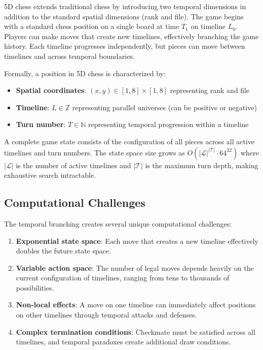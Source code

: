 \documentclass{article}
\begin{document}
5D chess extends traditional chess by introducing two temporal dimensions in addition to the standard spatial dimensions (rank and file). The game begins with a standard chess position on a single board at time $T_1$ on timeline $L_0$. Players can make moves that create new timelines, effectively branching the game history. Each timeline progresses independently, but pieces can move between timelines and across temporal boundaries.

Formally, a position in 5D chess is characterized by:
\begin{itemize}
    \item \textbf{Spatial coordinates}: $(x, y) \in [1,8] \times [1,8]$ representing rank and file
    \item \textbf{Timeline}: $L \in \mathbb{Z}$ representing parallel universes (can be positive or negative)
    \item \textbf{Turn number}: $T \in \mathbb{N}$ representing temporal progression within a timeline
\end{itemize}

A complete game state consists of the configuration of all pieces across all active timelines and turn numbers. The state space size grows as $O(|\mathcal{L}|^{|\mathcal{T}|} \cdot 64^{32})$ where $|\mathcal{L}|$ is the number of active timelines and $|\mathcal{T}|$ is the maximum turn depth, making exhaustive search intractable.

\subsection{Computational Challenges}

The temporal branching creates several unique computational challenges:

\begin{enumerate}
    \item \textbf{Exponential state space}: Each move that creates a new timeline effectively doubles the future state space.

    \item \textbf{Variable action space}: The number of legal moves depends heavily on the current configuration of timelines, ranging from tens to thousands of possibilities.

    \item \textbf{Non-local effects}: A move on one timeline can immediately affect positions on other timelines through temporal attacks and defenses.

    \item \textbf{Complex termination conditions}: Checkmate must be satisfied across all timelines, and temporal paradoxes create additional draw conditions.
\end{enumerate}
\end{document}
